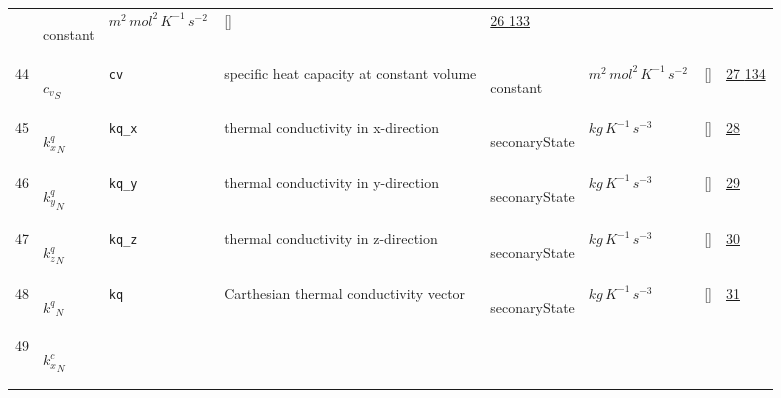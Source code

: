\begin{longtable}{|p{1cm}|p{3cm}|p{3cm}|p{7cm}|p{3.0cm}|p{3cm}|p{2cm}|p{1cm}|}
             & \begin{lay}constant \end{lay}
             & $ m^{2} \,mol^{2} \,K^{-1} \,s^{-2} \, $
             & []
             & \hyperlink{"e:26"}{ 26 }
                 \hyperlink{"e:133"}{ 133 }
                 \\
    44
             & \hypertarget{"v:44"}{ $ {c_{v}}_{S} $}
             & \verb|cv|
             & specific heat capacity at constant volume
             & \begin{lay}constant \end{lay}
             & $ m^{2} \,mol^{2} \,K^{-1} \,s^{-2} \, $
             & []
             & \hyperlink{"e:27"}{ 27 }
                 \hyperlink{"e:134"}{ 134 }
                 \\
    45
             & \hypertarget{"v:45"}{ $ {k^{q}_{x}}_{N} $}
             & \verb|kq_x|
             & thermal conductivity in x-direction
             & \begin{lay}seconaryState \end{lay}
             & $ kg \,K^{-1} \,s^{-3} \, $
             & []
             & \hyperlink{"e:28"}{ 28 }
                 \\
    46
             & \hypertarget{"v:46"}{ $ {k^{q}_{y}}_{N} $}
             & \verb|kq_y|
             & thermal conductivity in y-direction
             & \begin{lay}seconaryState \end{lay}
             & $ kg \,K^{-1} \,s^{-3} \, $
             & []
             & \hyperlink{"e:29"}{ 29 }
                 \\
    47
             & \hypertarget{"v:47"}{ $ {k^{q}_{z}}_{N} $}
             & \verb|kq_z|
             & thermal conductivity in z-direction
             & \begin{lay}seconaryState \end{lay}
             & $ kg \,K^{-1} \,s^{-3} \, $
             & []
             & \hyperlink{"e:30"}{ 30 }
                 \\
    48
             & \hypertarget{"v:48"}{ $ {k^{q}}_{N} $}
             & \verb|kq|
             & Carthesian thermal conductivity vector
             & \begin{lay}seconaryState \end{lay}
             & $ kg \,K^{-1} \,s^{-3} \, $
             & []
             & \hyperlink{"e:31"}{ 31 }
                 \\
    49
             & \hypertarget{"v:49"}{ $ {k^{c}_{x}}_{N} $}

\end{longtable}
